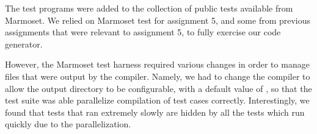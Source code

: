 \documentclass[pdftex,10pt,a4paper]{article}
\begin{document}
The test programs were added to the collection of public tests
available from Marmoset. We relied on Marmoset test for assignment 5,
and some from previous assignments that were relevant to assignment 5,
to fully exercise our code generator.

However, the Marmoset test harness required various changes in order
to manage files that were output by the compiler. Namely, we had to
change the compiler to allow the output directory to be configurable,
with a default value of , so that the test suite was able
parallelize compilation of test cases correctly. Interestingly, we
found that tests that ran extremely slowly are hidden by all the tests
which run quickly due to the parallelization.
\end{document}
